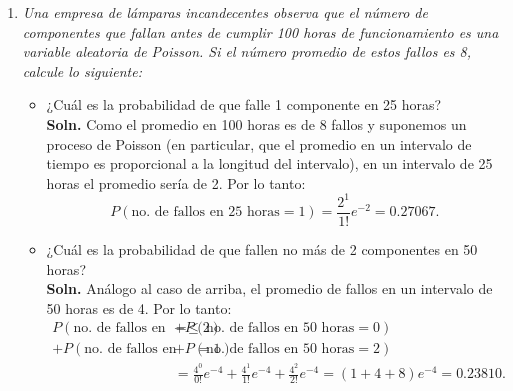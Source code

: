 \documentclass[letterpaper,11pt]{article}
\begin{document}
\begin{enumerate}
\item \emph{Una empresa de lámparas incandecentes observa que el número de componentes que fallan
antes de cumplir 100 horas de funcionamiento es una variable aleatoria de Poisson. Si el
número promedio de estos fallos es 8, calcule lo siguiente:}
\begin{itemize}
    \item ¿Cuál es la probabilidad de que falle 1 componente en 25 horas?\\
        {\bf Soln.} Como el promedio en 100 horas es de 8 fallos y suponemos un proceso de Poisson (en
        particular, que el promedio en un intervalo de tiempo es proporcional a la longitud del intervalo),
        en un intervalo de 25 horas el promedio sería de 2. Por lo tanto: 
        \[P(\text{no. de fallos en 25 horas} = 1)= \frac{2^1}{1!}e^{-2}=0.27067. \] 
    \item ¿Cuál es la probabilidad de que fallen no más de 2 componentes en 50 horas?\\
        {\bf Soln.} Análogo al caso de arriba, el promedio de fallos en un intervalo de 50 horas es de 4.
        Por lo tanto:
        \begin{align*}
        P(\text{no. de fallos en 50 horas} \leq 2)=&  
        +P(\text{no. de fallos en 50 horas} = 0)\\
        +P(\text{no. de fallos en 50 horas} =1)
        &+P(\text{no. de fallos en 50 horas} = 2)\\
        &=\frac{4^0}{0!}e^{-4}+\frac{4^1}{1!}e^{-4}+\frac{4^2}{2!}e^{-4}=(1+4+8)e^{-4}=0.23810. \
    \end{align*}
        

\end{itemize}
\end{enumerate}
\end{document}
